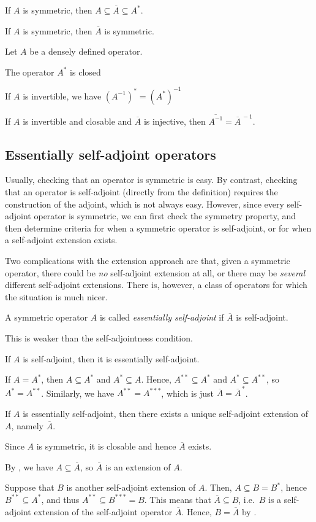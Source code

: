 \bc
If $A$ is symmetric, then $A\subseteq \overline{A}\subseteq A^*$.
\ec


\bc
If $A$ is symmetric, then $\overline{A}$ is symmetric.
\ec

\bt
Let $A$ be a densely defined operator.
\ben[label=(\roman*)]
\item The operator $A^*$ is closed
\item If $A$ is invertible, we have $(A^{-1})^*=(A^*)^{-1}$
\item If $A$ is invertible and closable and $\overline{A}$ is injective, then $\overline{A^{-1}}=\overline{A}^{\,-1}$.
\een
\et

\subsection{Essentially self-adjoint operators}

Usually, checking that an operator is symmetric is easy. By contrast, checking that an operator is self-adjoint (directly from the definition) requires the construction of the adjoint, which is not always easy. However, since every self-adjoint operator is symmetric, we can first check the symmetry property, and then determine criteria for when a symmetric operator is self-adjoint, or for when a self-adjoint extension exists.

Two complications with the extension approach are that, given a symmetric operator, there could be \emph{no} self-adjoint extension at all, or there may be \emph{several} different self-adjoint extensions. There is, however, a class of operators for which the situation is much nicer.

\bd
A symmetric operator $A$ is called \emph{essentially self-adjoint} if $\overline{A}$ is self-adjoint.
\ed

This is weaker than the self-adjointness condition.

\bp
If $A$ is self-adjoint, then it is essentially self-adjoint. 
\ep

\bq
If $A = A^*$, then $A\subseteq A^*$ and $A^* \subseteq A$. Hence, $A^{**}\subseteq A^*$ and $A^*\subseteq A^{**}$, so $A^* = A^{**}$. Similarly, we have $A^{**} = A^{***}$, which is just $\overline{A}=\overline{A}^{\,*}$.
\eq

\bt
If $A$ is essentially self-adjoint, then there exists a unique self-adjoint extension of $A$, namely $\overline{A}$.
\et

\bq
\ben[label=(\roman*)]
\item Since $A$ is symmetric, it is closable and hence $\overline{A}$ exists.
\item By , we have $A\subseteq \overline{A}$, so $\overline{A}$ is an extension of $A$. 
\item Suppose that $B$ is another self-adjoint extension of $A$. Then, $A\subseteq B = B^*$, hence $B^{**}\subseteq A^*$, and thus $A^{**}\subseteq B^{***}=B$. This means that $\overline{A}\subseteq B$, i.e.\ $B$ is a self-adjoint extension of the self-adjoint operator $\overline{A}$. Hence, $B=\overline{A}$ by .\qedhere
\een
\eq

